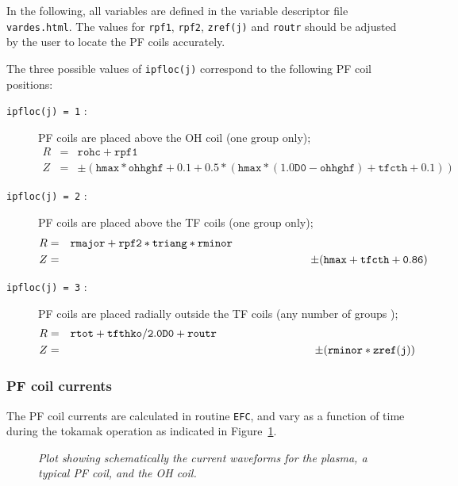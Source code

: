 \documentclass[11pt,a4paper]{report}
\begin{document}
In the following, all variables are defined in the variable descriptor file
\texttt{vardes.html}. The values for \texttt{rpf1}, \texttt{rpf2},
\texttt{zref(j)} and \texttt{routr} should be adjusted by the user to locate
the PF coils accurately.

The three possible values of \texttt{ipfloc(j)} correspond to the following PF
coil positions:

\begin{description}

\item [\texttt{ipfloc(j) = 1} :]  PF coils are placed above the OH coil (one
group only);
\begin{eqnarray*}
R & = & \mathtt{rohc + rpf1} \\
Z & = & \pm
\mathtt{( hmax*ohhghf + 0.1 + 0.5*( hmax*(1.0D0-ohhghf)+tfcth+0.1) )}
\end{eqnarray*}

\item [\texttt{ipfloc(j) = 2} :]  PF coils are placed above the TF coils (one
group only);
\begin{eqnarray*}
R & = & \mathtt{rmajor + rpf2*triang*rminor} \hspace{62mm} \\
Z & = & \pm (\mathtt{hmax + tfcth + 0.86})
\end{eqnarray*}

\item [\texttt{ipfloc(j) = 3} :]  PF coils are placed radially outside the TF
coils (any number of groups );
\begin{eqnarray*}
R & = & \mathtt{rtot + tfthko/2.0D0 + routr} \hspace{63mm}\\
Z & = & \pm(\mathtt{rminor*zref(j)})
\end{eqnarray*}

\end{description}

\subsubsection{PF coil currents}

The PF coil currents are calculated in routine \texttt{EFC}, and vary as a
function of time during the tokamak operation as indicated in
Figure~\ref{fig:current_vs_time}.

\begin{figure}[tbph]
\caption[Coil and plasma current waveforms]
{\label{fig:current_vs_time}
  \textit{Plot showing schematically the current waveforms for the plasma, a
    typical PF coil, and the OH coil.}
}
\end{figure}
\end{document}

